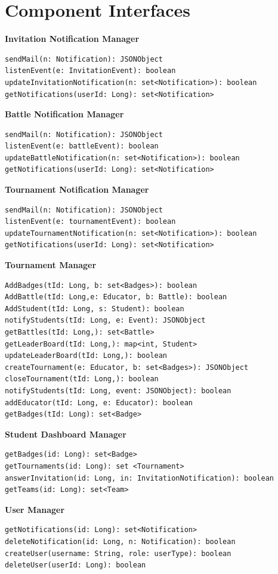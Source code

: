 \section{Component Interfaces}

\textbf{Invitation Notification Manager}
\begin{verbatim}
sendMail(n: Notification): JSONObject
listenEvent(e: InvitationEvent): boolean
updateInvitationNotification(n: set<Notification>): boolean
getNotifications(userId: Long): set<Notification>
\end{verbatim}

\textbf{Battle Notification Manager}
\begin{verbatim}
sendMail(n: Notification): JSONObject
listenEvent(e: battleEvent): boolean
updateBattleNotification(n: set<Notification>): boolean
getNotifications(userId: Long): set<Notification>
\end{verbatim}

\textbf{Tournament Notification Manager}
\begin{verbatim}
sendMail(n: Notification): JSONObject
listenEvent(e: tournamentEvent): boolean
updateTournamentNotification(n: set<Notification>): boolean
getNotifications(userId: Long): set<Notification>
\end{verbatim}

\textbf{Tournament Manager}
\begin{verbatim}
AddBadges(tId: Long, b: set<Badges>): boolean
AddBattle(tId: Long,e: Educator, b: Battle): boolean
AddStudent(tId: Long, s: Student): boolean
notifyStudents(tId: Long, e: Event): JSONObject
getBattles(tId: Long,): set<Battle>
getLeaderBoard(tId: Long,): map<int, Student>
updateLeaderBoard(tId: Long,): boolean
createTournament(e: Educator, b: set<Badges>): JSONObject
closeTournament(tId: Long,): boolean
notifyStudents(tId: Long, event: JSONObject): boolean
addEducator(tId: Long, e: Educator): boolean
getBadges(tId: Long): set<Badge>
\end{verbatim}

\textbf{Student Dashboard Manager}
\begin{verbatim}
getBadges(id: Long): set<Badge>
getTournaments(id: Long): set <Tournament>
answerInvitation(id: Long, in: InvitationNotification): boolean
getTeams(id: Long): set<Team>
\end{verbatim}

\textbf{User Manager}
\begin{verbatim}
getNotifications(id: Long): set<Notification>
deleteNotification(id: Long, n: Notification): boolean
createUser(username: String, role: userType): boolean
deleteUser(userId: Long): boolean
\end{verbatim}

